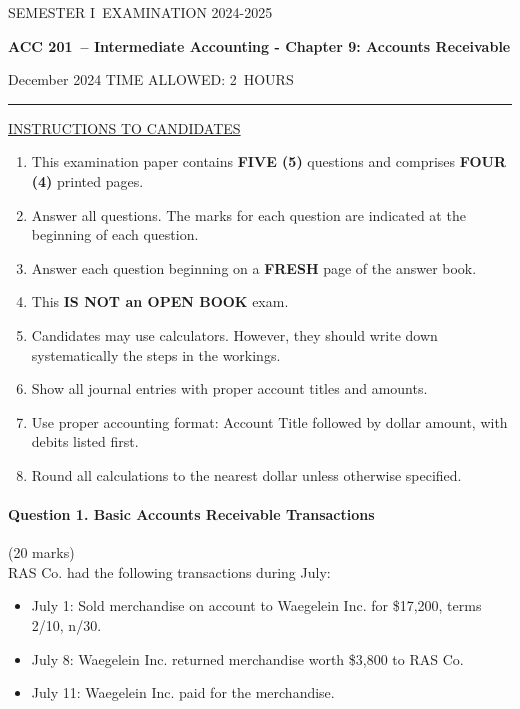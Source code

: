 \documentclass[12pt]{article}
\newcommand{\masunitnumber}{ACC 201}
\newcommand{\examdate}{December 2024}
\newcommand{\academicyear}{2024-2025}
\newcommand{\semester}{I}
\newcommand{\coursename}{Intermediate Accounting - Chapter 9: Accounts Receivable}
\newcommand{\numberofhours}{2}
\begin{document}
\setlength{\headsep}{5truemm}
\setlength{\headheight}{14.5truemm}
\setlength{\voffset}{-0.45truein}
\renewcommand{\headrulewidth}{0.0pt}
\begin{center}
SEMESTER \semester\ EXAMINATION \academicyear
\end{center}
\begin{center}
{\bf \masunitnumber\ -- \coursename}
\end{center}
\vspace{20truemm}
\noindent \examdate\hspace{45truemm} TIME ALLOWED: \numberofhours\ HOURS
\vspace{19truemm}
\hrule
\vspace{19truemm}
\noindent\underline{INSTRUCTIONS TO CANDIDATES}
\vspace{8truemm}
\begin{enumerate}
\item This examination paper contains {\bf FIVE (5)} questions and comprises 
{\bf FOUR (4)} printed pages.
\item Answer all questions. 
The marks for each question are indicated at the beginning of each question.
\item Answer each question beginning on a {\bf FRESH} page of the answer book.
\item This {\bf IS NOT an OPEN BOOK} exam.
\item Candidates may use calculators. However, they should write down systematically the steps in the workings.
\item Show all journal entries with proper account titles and amounts.
\item Use proper accounting format: Account Title followed by dollar amount, with debits listed first.
\item Round all calculations to the nearest dollar unless otherwise specified.
\end{enumerate}
\newpage
\lhead{}
\rhead{\masunitnumber}
\chead{}
\lfoot{}
\cfoot{\thepage}
\rfoot{}
\setlength{\footskip}{45pt}
\paragraph{Question 1. Basic Accounts Receivable Transactions}\hfill (20 marks)\\
RAS Co. had the following transactions during July:
\begin{itemize}
\item July 1: Sold merchandise on account to Waegelein Inc. for \$17,200, terms 2/10, n/30.
\item July 8: Waegelein Inc. returned merchandise worth \$3,800 to RAS Co.
\item July 11: Waegelein Inc. paid for the merchandise.
\end{itemize}
\end{document}
